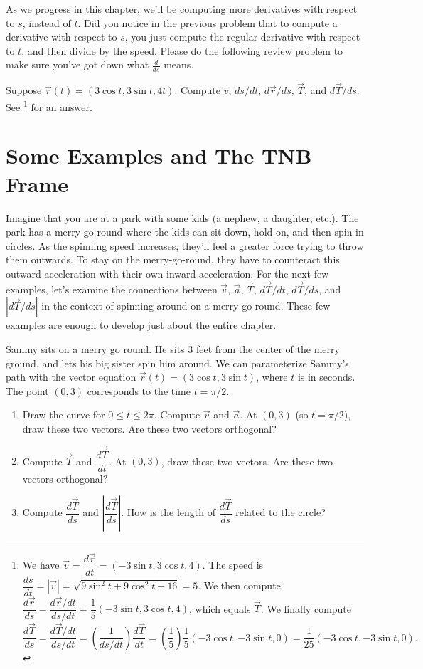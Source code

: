 As we progress in this chapter, we'll be computing more derivatives with respect to $s$, instead of $t$. Did you notice in the previous problem that to compute a derivative with respect to $s$, you just compute the regular derivative with respect to $t$, and then divide by the speed. Please do the following review problem to make sure you've got down what $\frac{d}{ds}$ means. 


\begin{review*}
 Suppose $\vec r(t)=(3\cos t,3\sin t,4t)$.  Compute $v$, $ds/dt$, $d\vec r/ds$, $\vec T$, and $d\vec T/ds$. See 
\footnote{
We have $\vec v = \dfrac{d\vec r}{dt} = (-3\sin t, 3\cos t, 4)$. 
The speed is $\dfrac{ds}{dt}=|\vec v| = \sqrt{9\sin^2t+9\cos^2t+16}=5$.  
We then compute $\dfrac{d\vec r}{ds}=\dfrac{d\vec r/dt}{ds/dt} = \dfrac{1}{5}(-3\sin t, 3\cos t, 4)$, 
which equals $\vec T$.
We finally compute
$$
\dfrac{d\vec T}{ds}=\dfrac{d\vec T/dt}{ds/dt}=\left(\dfrac{1}{ds/dt}\right)\dfrac{d\vec T}{dt} = \left(\dfrac{1}{5}\right)\dfrac{1}{5}(-3\cos t, -3\sin t, 0) =  \dfrac{1}{25}(-3\cos t, -3\sin t, 0).  
$$
} for an answer.
\end{review*}

\section{Some Examples and The TNB Frame}

Imagine that you are at a park with some kids (a nephew, a daughter, etc.).  The park has a merry-go-round where the kids can sit down, hold on, and then spin in circles. As the spinning speed increases, they'll feel a greater  force trying to throw them  outwards. To stay on the merry-go-round, they have to counteract this outward acceleration with their own inward acceleration. For the next few examples, let's examine the connections between $\vec v$, $\vec a$, $\vec T$, $d\vec T/dt$, $d\vec T/ds$, and $|d\vec T/ds|$ in the context of spinning around on a merry-go-round. These few examples are enough to develop just about the entire chapter. 



\begin{problem}
 Sammy sits on a merry go round. He sits 3 feet from the center of the merry ground, and lets his big sister spin him around. We can parameterize Sammy's path with the vector equation $\vec r(t) = (3\cos t, 3\sin t)$, where $t$ is in seconds.  The point $(0,3)$ corresponds to the time $t=\pi/2$.
\begin{enumerate}
 \item Draw the curve for $0\leq t\leq 2\pi$. Compute $\vec v$ and $\vec a$. At $(0,3)$ (so $t=\pi/2$), draw these two vectors. Are these two vectors orthogonal? 
 \item Compute $\vec T$ and $\dfrac{d\vec T}{dt}$. At $(0,3)$, draw these two vectors. Are these two vectors orthogonal? 
 \item Compute $\dfrac{d\vec T}{ds}$ and $\left|\dfrac{d\vec T}{ds}\right|$. How is the length of $\dfrac{d\vec T}{ds}$ related to the circle?  
\end{enumerate}
\end{problem}

